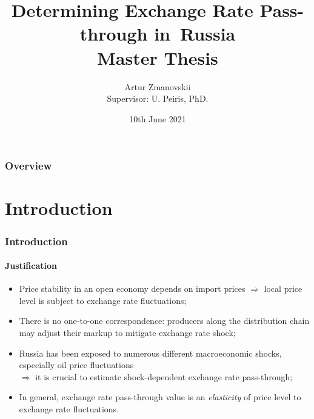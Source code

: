 \documentclass{beamer}
\title[ERPT in Russia]{Determining Exchange Rate Pass-through in~Russia\\ \vspace{0.2cm} \small{Master Thesis}}
\author[Artur Zmanovskii]{Artur Zmanovskii\\\vspace{0.2cm}\footnotesize{Supervisor: U. Peiris, PhD. }}
\institute[ICEF]{Higher School of Economics \\ International College of Econonomics and Finance}
\date{10th June 2021}
\begin{document}

\frame[plain]{\titlepage}	%

\begin{frame}
\frametitle{Overview}
\tableofcontents[hideothersubsections]
\end{frame}

\section{Introduction}
\begin{frame}
\frametitle{Introduction}
\framesubtitle{Justification}
\begin{itemize}
	\item Price stability in an open economy depends on import prices $\Rightarrow$ local price level is subject to exchange rate fluctuations;
	\item There is no one-to-one correspondence: producers along the distribution chain may adjust their markup to mitigate exchange rate shock;
	\item Russia has been exposed to numerous different macroeconomic shocks, especially oil price fluctuations\\$\Rightarrow$ it is crucial to estimate shock-dependent exchange rate pass-through;
	\item In general, exchange rate pass-through value is an \textit{elasticity} of price level to exchange rate fluctuations. 
\end{itemize}
\end{frame}
\end{document}
